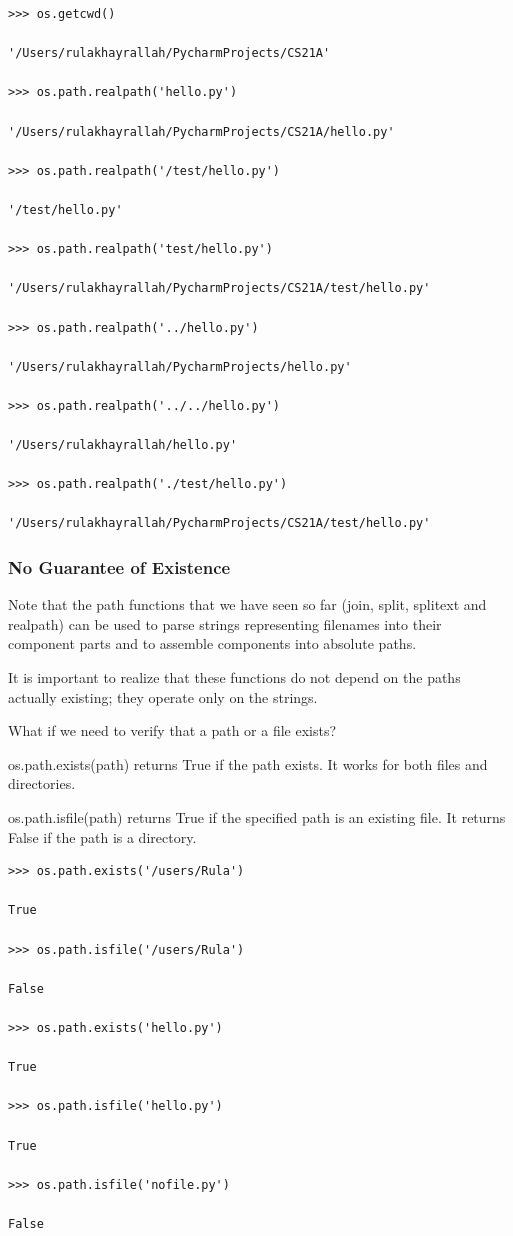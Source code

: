\documentclass{article}
\begin{document}
\begin{lstlisting}
>>> os.getcwd()

'/Users/rulakhayrallah/PycharmProjects/CS21A'

>>> os.path.realpath('hello.py')

'/Users/rulakhayrallah/PycharmProjects/CS21A/hello.py'

>>> os.path.realpath('/test/hello.py')

'/test/hello.py'

>>> os.path.realpath('test/hello.py')

'/Users/rulakhayrallah/PycharmProjects/CS21A/test/hello.py'

>>> os.path.realpath('../hello.py')

'/Users/rulakhayrallah/PycharmProjects/hello.py'

>>> os.path.realpath('../../hello.py')

'/Users/rulakhayrallah/hello.py'

>>> os.path.realpath('./test/hello.py')

'/Users/rulakhayrallah/PycharmProjects/CS21A/test/hello.py'
\end{lstlisting}

\subsubsection{No Guarantee of Existence}
Note that the path functions that we have seen so far (join, split, splitext and realpath) can be used to parse strings representing filenames into their component parts and to assemble components into absolute paths.

It is important to realize that these functions do not depend on the paths actually existing; they operate only on the strings.

What if we need to verify that a path or a file exists?

os.path.exists(path) returns True if the path exists.   It works for both files and directories.

os.path.isfile(path) returns True if the specified path  is an existing  file.   It returns False if the path is a directory.
\begin{lstlisting}
>>> os.path.exists('/users/Rula')

True

>>> os.path.isfile('/users/Rula')

False

>>> os.path.exists('hello.py')

True

>>> os.path.isfile('hello.py')

True

>>> os.path.isfile('nofile.py')

False
\end{lstlisting}
\end{document}
